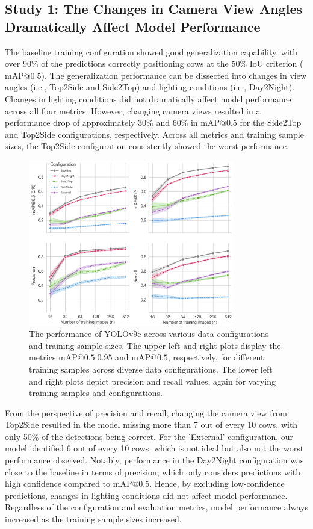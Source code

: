 \subsection*{Study 1: The Changes in Camera View Angles Dramatically Affect Model Performance}

The baseline training configuration showed good generalization capability, with over 90\% of the predictions correctly positioning cows at the 50\% IoU criterion ($\text{mAP@{0.5}}$). The generalization performance can be dissected into changes in view angles (i.e., Top2Side and Side2Top) and lighting conditions (i.e., Day2Night). Changes in lighting conditions did not dramatically affect model performance across all four metrics. However, changing camera views resulted in a performance drop of approximately 30\% and 60\% in $\text{mAP@{0.5}}$ for the Side2Top and Top2Side configurations, respectively. Across all metrics and training sample sizes, the Top2Side configuration consistently showed the worst performance.

\begin{figure}[h]
    \centering
    \includegraphics[width=0.8\textwidth]{figure_3.jpg}
    \caption{The performance of YOLOv9e across various data configurations and training sample sizes. The upper left and right plots display the metrics $\text{mAP@{0.5:0.95}}$ and $\text{mAP@{0.5}}$, respectively, for different training samples across diverse data configurations. The lower left and right plots depict precision and recall values, again for varying training samples and configurations.}
    \label{fig:schemes}
\end{figure}

From the perspective of precision and recall, changing the camera view from Top2Side resulted in the model missing more than 7 out of every 10 cows, with only 50\% of the detections being correct. For the 'External' configuration, our model identified 6 out of every 10 cows, which is not ideal but also not the worst performance observed. Notably, performance in the Day2Night configuration was close to the baseline in terms of precision, which only considers predictions with high confidence compared to $\text{mAP@{0.5}}$. Hence, by excluding low-confidence predictions, changes in lighting conditions did not affect model performance. Regardless of the configuration and evaluation metrics, model performance always increased as the training sample sizes increased.

